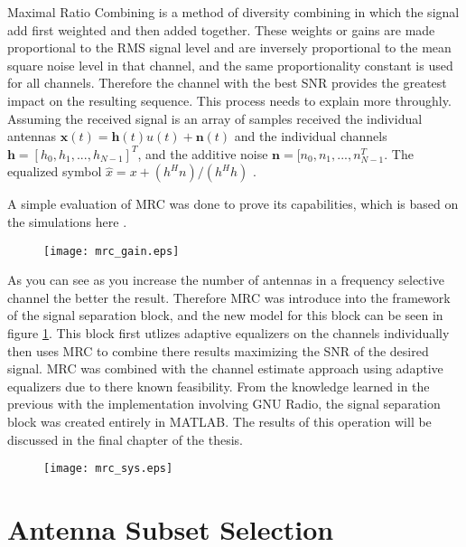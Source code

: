 Maximal Ratio Combining is a method of diversity combining in which the signal add first weighted and then added together.  These weights or gains are made proportional to the RMS signal level and are inversely proportional to the mean square noise level in that channel, and the same proportionality constant is used for all channels\cite{fs1037c}.  Therefore the channel with the best SNR provides the greatest impact on the resulting sequence.  This process needs to explain more throughly.  Assuming the received signal is an array of samples received the individual antennas \(\boldsymbol{x}(t)=\boldsymbol{h}(t)u(t)+\boldsymbol{n}(t)\) and the individual channels \(\boldsymbol{h}=[h_{0},h_{1},...,h_{N-1}]^{T}\), and the additive noise \(\boldsymbol{n}=[n_{0},n_{1},...,n_{N-1}^{T}\).  The equalized symbol \(\hat{x}=x+(h^{H}n)/(h^{H}h) \) \cite{diversity}.

A simple evaluation of MRC was done to prove its capabilities, which is based on the simulations here \cite{mrc_m}.

\begin{figure}
\texttt{[image: mrc\_gain.eps]}
\end{figure}

As you can see as you increase the number of antennas in a frequency selective channel the better the result.  Therefore MRC was introduce into the framework of the signal separation block, and the new model for this block can be seen in figure \ref{mrc_sys}.  This block first utlizes adaptive equalizers on the channels individually then uses MRC to combine there results maximizing the SNR of the desired signal.  MRC was combined with the channel estimate approach using adaptive equalizers due to there known feasibility.  From the knowledge learned in the previous with the implementation involving GNU Radio, the signal separation block was created entirely in MATLAB.  The results of this operation will be discussed in the final chapter of the thesis.\\

\begin{figure}\label{mrc_sys}
\texttt{[image: mrc\_sys.eps]}
\end{figure}

\section{Antenna Subset Selection}

